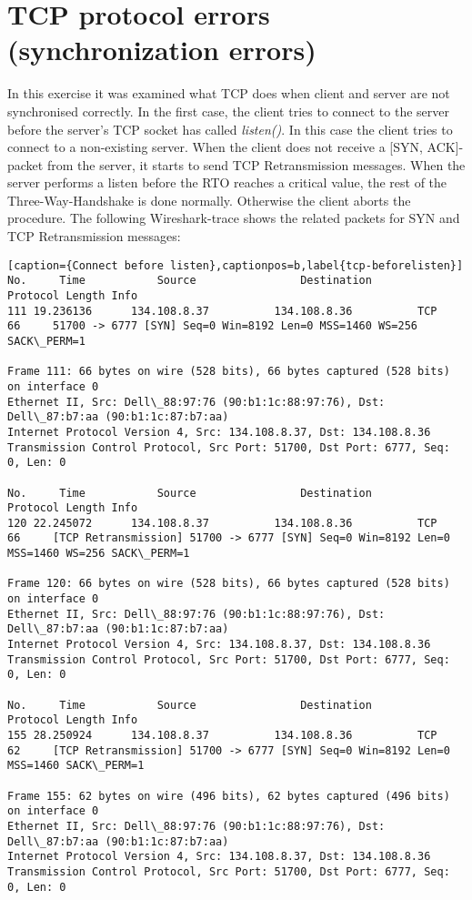 \section{TCP protocol errors (synchronization errors)}
In this exercise it was examined what TCP does when client and server are not synchronised
correctly. In the first case, the client tries to connect to the server before the server's TCP socket has called \textit{listen()}. In this case the client tries to connect to a non-existing server. When the client does not receive a [SYN, ACK]-packet from the server, it starts to send TCP Retransmission messages. When the server performs a listen before the RTO reaches a critical value, the rest of the Three-Way-Handshake is done normally. Otherwise the client aborts the procedure. The following Wireshark-trace shows the related packets for SYN and TCP Retransmission messages:
\\
\begin{lstlisting}[caption={Connect before listen},captionpos=b,label{tcp-beforelisten}]
No.     Time           Source                Destination           Protocol Length Info
111 19.236136      134.108.8.37          134.108.8.36          TCP      66     51700 -> 6777 [SYN] Seq=0 Win=8192 Len=0 MSS=1460 WS=256 SACK\_PERM=1

Frame 111: 66 bytes on wire (528 bits), 66 bytes captured (528 bits) on interface 0
Ethernet II, Src: Dell\_88:97:76 (90:b1:1c:88:97:76), Dst: Dell\_87:b7:aa (90:b1:1c:87:b7:aa)
Internet Protocol Version 4, Src: 134.108.8.37, Dst: 134.108.8.36
Transmission Control Protocol, Src Port: 51700, Dst Port: 6777, Seq: 0, Len: 0

No.     Time           Source                Destination           Protocol Length Info
120 22.245072      134.108.8.37          134.108.8.36          TCP      66     [TCP Retransmission] 51700 -> 6777 [SYN] Seq=0 Win=8192 Len=0 MSS=1460 WS=256 SACK\_PERM=1

Frame 120: 66 bytes on wire (528 bits), 66 bytes captured (528 bits) on interface 0
Ethernet II, Src: Dell\_88:97:76 (90:b1:1c:88:97:76), Dst: Dell\_87:b7:aa (90:b1:1c:87:b7:aa)
Internet Protocol Version 4, Src: 134.108.8.37, Dst: 134.108.8.36
Transmission Control Protocol, Src Port: 51700, Dst Port: 6777, Seq: 0, Len: 0

No.     Time           Source                Destination           Protocol Length Info
155 28.250924      134.108.8.37          134.108.8.36          TCP      62     [TCP Retransmission] 51700 -> 6777 [SYN] Seq=0 Win=8192 Len=0 MSS=1460 SACK\_PERM=1

Frame 155: 62 bytes on wire (496 bits), 62 bytes captured (496 bits) on interface 0
Ethernet II, Src: Dell\_88:97:76 (90:b1:1c:88:97:76), Dst: Dell\_87:b7:aa (90:b1:1c:87:b7:aa)
Internet Protocol Version 4, Src: 134.108.8.37, Dst: 134.108.8.36
Transmission Control Protocol, Src Port: 51700, Dst Port: 6777, Seq: 0, Len: 0
\end{lstlisting}

